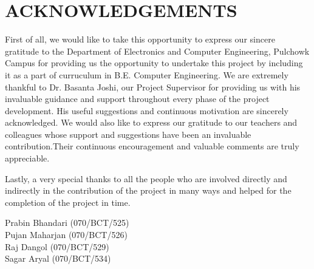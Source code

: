 
\newpage
{} {}

\section*{ACKNOWLEDGEMENTS}

First of all, we would like to take this opportunity to express our sincere gratitude to the Department of Electronics and Computer Engineering, Pulchowk Campus for providing us the opportunity to undertake this project by including it as a part of curruculum in B.E. Computer Engineering. We are extremely thankful to Dr. Basanta Joshi, our Project Supervisor for providing us with his invaluable guidance and support throughout every phase of the project development. His useful suggestions and continuous motivation are sincerely acknowledged. We would also like to express our gratitude to our teachers and colleagues whose support and suggestions have been an invaluable contribution.Their continuous encouragement and valuable comments are truly appreciable.

Lastly, a very special thanks to all the people who are involved directly and indirectly in the contribution of the project in many ways and helped for the completion of the project in time.

Prabin Bhandari (070/BCT/525)\\
Pujan Maharjan (070/BCT/526)\\
Raj Dangol (070/BCT/529) \\
Sagar Aryal (070/BCT/534) \\


